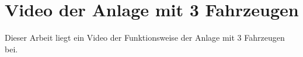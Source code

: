 \section{Video der Anlage mit 3 Fahrzeugen}
	Dieser Arbeit liegt ein Video der Funktionsweise der Anlage mit 3 Fahrzeugen bei.
	
	\clearpage
	
	
		
	\clearpage
	\listoffigures
	
	\clearpage
	\listoftables
	